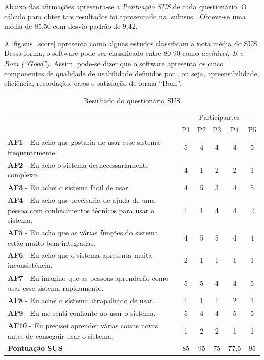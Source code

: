 Abaixo das afirmações apresenta-se a \textit{Pontuação SUS} de cada questionário. O cálculo
para obter tais resultados foi apresentado na \autoref{sub:sus}. Obteve-se uma média de
85,50 com desvio padrão de 9,42.

A \autoref{fig:sus_score} apresenta como alguns estudos classificam a nota média do SUS.
Dessa forma, o software pode ser classificado entre 80-90 como \textit{aceitável, B e Bom (``Good'')}.
Assim, pode-se dizer que o software apresenta os cinco componentes de qualidade de usabilidade definidos
por , ou seja, apreensibilidade, eficiência, recordação, erros e satisfação
de forma ``Bom''.

\begin{table}[!ht]
  \centering
  \caption{Resultado do questionário SUS}
  \label{tab:sus_result}
\begin{tabular}{>{\raggedright}p{0.45\paperwidth}||ccccc}
\hline
\multicolumn{6}{c}{\textbf{Resultado do questionário SUS}}\tabularnewline
\hline
\hline
\multirow{2}{0.5\paperwidth}{\centering{}\textbf{Afirmações}} & \multicolumn{5}{c}{Participantes}\tabularnewline
 & P1 & P2 & P3 & P4 & P5\tabularnewline
\hline
\hline
\textbf{AF1} - {\small{}Eu acho que gostaria de usar esse sistema frequentemente.}
 & 5 & 4 & 4 & 4 & 5\tabularnewline
\textbf{AF2} - {\small{}Eu acho o sistema desnecessariamente complexo.}
 & 4 & 1 & 2 & 2 & 1\tabularnewline
\textbf{AF3} - {\small{}Eu achei o sistema fácil de usar.}
 & 4 & 5 & 3 & 4 & 5\tabularnewline
\textbf{AF4} - {\small{}Eu acho que precisaria de ajuda de uma pessoa com conhecimentos
técnicos para usar o sistema.}
 & 1 & 1 & 4 & 4 & 2\tabularnewline
\textbf{AF5} - {\small{}Eu acho que as várias funções do sistema estão muito bem
integradas.}
 & 4 & 5 & 5 & 4 & 4\tabularnewline
\textbf{AF6} - {\small{}Eu acho que o sistema apresenta muita inconsistência.}
 & 2 & 1 & 1 & 1 & 1\tabularnewline
\textbf{AF7} - {\small{}Eu imagino que as pessoas aprenderão como usar esse sistema
rapidamente.}
 & 5 & 5 & 4 & 4 & 5\tabularnewline
\textbf{AF8} - {\small{}Eu achei o sistema atrapalhado de usar.}
 & 1 & 1 & 1 & 2 & 1\tabularnewline
\textbf{AF9} - {\small{}Eu me senti confiante ao usar o sistema.}
 & 5 & 4 & 4 & 5 & 5\tabularnewline
\textbf{AF10} - {\small{}Eu precisei aprender várias coisas novas antes de conseguir
usar o sistema.}
 & 1 & 2 & 2 & 1 & 1\tabularnewline
\hline
\centering{}\textbf{Pontuação SUS} & 85 & 95 & 75 & 77,5 & 95\tabularnewline
\hline
\end{tabular}
\doautor
\end{table}

